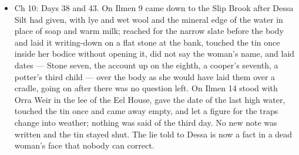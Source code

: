\documentclass{design/chronicle}
\begin{document}
{\begin{itemize}[leftmargin=1.4em,itemsep=1pt,topsep=3pt,parsep=0pt]
\item Ch 10: Days 38 and 43. On Ilmen 9 came down to the Slip Brook after Dessa Silt had given, with lye and wet wool and the mineral edge of the water in place of soap and warm milk; reached for the narrow slate before the body and laid it writing-down on a flat stone at the bank, touched the tin once inside her bodice without opening it, did not say the woman’s name, and laid dates --- Stone seven, the account up on the eighth, a cooper’s seventh, a potter’s third child --- over the body as she would have laid them over a cradle, going on after there was no question left. On Ilmen 14 stood with Orra Weir in the lee of the Eel House, gave the date of the last high water, touched the tin once and came away empty, and let a figure for the traps change into weather; nothing was said of the third day. No new note was written and the tin stayed shut. The lie told to Dessa is now a fact in a dead woman’s face that nobody can correct.

\end{itemize}
}
\end{document}
